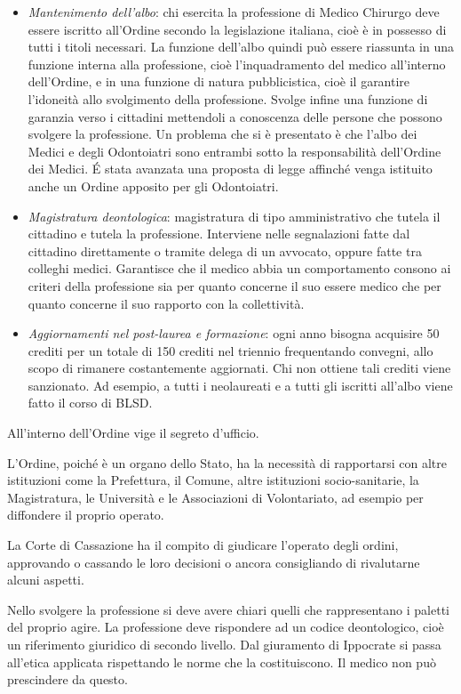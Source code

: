 \begin{itemize}
\item
  \emph{Mantenimento dell'albo}: chi esercita la professione di Medico
  Chirurgo deve essere iscritto all'Ordine secondo la legislazione
  italiana, cioè è in possesso di tutti i titoli necessari. La funzione
  dell'albo quindi può essere riassunta in una funzione interna alla
  professione, cioè l'inquadramento del medico all'interno dell'Ordine,
  e in una funzione di natura pubblicistica, cioè il garantire
  l'idoneità allo svolgimento della professione. Svolge infine una
  funzione di garanzia verso i cittadini mettendoli a conoscenza delle
  persone che possono svolgere la professione. Un problema che si è
  presentato è che l'albo dei Medici e degli Odontoiatri sono entrambi
  sotto la responsabilità dell'Ordine dei Medici. É stata avanzata una
  proposta di legge affinché venga istituito anche un Ordine apposito
  per gli Odontoiatri.
\item
  \emph{Magistratura deontologica}: magistratura di tipo amministrativo
  che tutela il cittadino e tutela la professione. Interviene nelle
  segnalazioni fatte dal cittadino direttamente o tramite delega di un
  avvocato, oppure fatte tra colleghi medici. Garantisce che il medico
  abbia un comportamento consono ai criteri della professione sia per
  quanto concerne il suo essere medico che per quanto concerne il suo
  rapporto con la collettività.
\item
  \emph{Aggiornamenti nel post-laurea e formazione}: ogni anno bisogna
  acquisire 50 crediti per un totale di 150 crediti nel triennio
  frequentando convegni, allo scopo di rimanere
costantemente aggiornati. Chi non ottiene tali crediti viene sanzionato.
Ad esempio, a tutti i neolaureati e a tutti gli iscritti all'albo viene
fatto il corso di BLSD.
\end{itemize}

All'interno dell'Ordine vige il segreto d'ufficio.

L'Ordine, poiché è un organo dello Stato, ha la necessità di rapportarsi
con altre istituzioni come la Prefettura, il Comune, altre istituzioni
socio-sanitarie, la Magistratura, le Università e le Associazioni di
Volontariato, ad esempio per diffondere il proprio operato.

La Corte di Cassazione ha il compito di giudicare l'operato degli
ordini, approvando o cassando le loro decisioni o ancora consigliando di
rivalutarne alcuni aspetti.

Nello svolgere la professione si deve avere chiari quelli che
rappresentano i paletti del proprio agire. La professione deve
rispondere ad un codice deontologico, cioè un riferimento giuridico di
secondo livello. Dal giuramento di Ippocrate si passa all'etica
applicata rispettando le norme che la costituiscono. Il medico non può
prescindere da questo.

